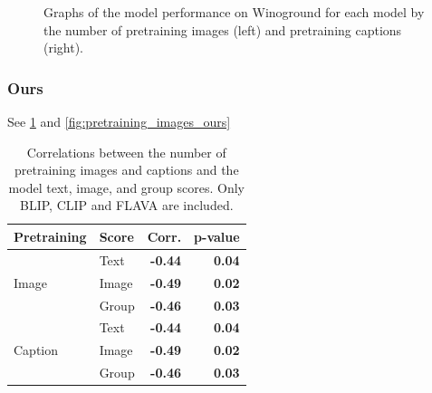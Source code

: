 \begin{figure}[ht]
    \centering
    \caption{Graphs of the model performance on Winoground for each model by the number of pretraining images (left) and pretraining captions (right).}
    \label{fig:pretraining_images_baseline}
\end{figure}

\subsubsection{Ours}

See \cref{tab:data-size-correlations-ours}  and \cref{fig:pretraining_images_ours}

\begin{table}[ht]
\centering
\begin{tabular}{llrr}
\toprule
Pretraining & Score & Corr. & p-value\\\midrule
               & Text    & \textbf{-0.44} & \textbf{0.04} \\
 Image              & Image   & \textbf{-0.49} & \textbf{0.02} \\
               & Group   & \textbf{-0.46} & \textbf{0.03} \\
             & Text    & \textbf{-0.44} & \textbf{0.04} \\
 Caption            & Image   & \textbf{-0.49} & \textbf{0.02} \\
             & Group   & \textbf{-0.46} & \textbf{0.03} \\
\bottomrule
\end{tabular}
\caption{Correlations between the number of pretraining images and captions and the model text, image, and group scores. Only BLIP, CLIP and FLAVA are included.}
\label{tab:data-size-correlations-ours}
\end{table}

